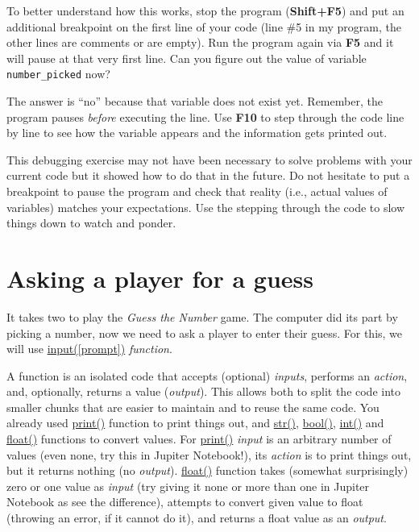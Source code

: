 \documentclass[
]{book}
\begin{document}
To better understand how this works, stop the program (\textbf{Shift+F5}) and put an additional breakpoint on the first line of your code (line \#5 in my program, the other lines are comments or are empty). Run the program again via \textbf{F5} and it will pause at that very first line. Can you figure out the value of variable \texttt{number\_picked} now?

The answer is ``no'' because that variable does not exist yet. Remember, the program pauses \emph{before} executing the line. Use \textbf{F10} to step through the code line by line to see how the variable appears and the information gets printed out.

This debugging exercise may not have been necessary to solve problems with your current code but it showed how to do that in the future. Do not hesitate to put a breakpoint to pause the program and check that reality (i.e., actual values of variables) matches your expectations. Use the stepping through the code to slow things down to watch and ponder.

\hypertarget{input-function}{%
\section{Asking a player for a guess}\label{input-function}}

It takes two to play the \emph{Guess the Number} game. The computer did its part by picking a number, now we need to ask a player to enter their guess. For this, we will use \href{https://docs.python.org/3/library/functions.html\#input}{input({[}prompt{]})} \emph{function}.

A function is an isolated code that accepts (optional) \emph{inputs}, performs an \emph{action}, and, optionally, returns a value (\emph{output}). This allows both to split the code into smaller chunks that are easier to maintain and to reuse the same code. You already used \href{https://docs.python.org/3/library/functions.html\#print}{print()} function to print things out, and \href{https://docs.python.org/3/library/functions.html\#func-str}{str()}, \href{https://docs.python.org/3/library/functions.html\#bool}{bool()}, \href{https://docs.python.org/3/library/functions.html\#int}{int()} and \href{https://docs.python.org/3/library/functions.html\#float}{float()} functions to convert values. For \href{https://docs.python.org/3/library/functions.html\#print}{print()} \emph{input} is an arbitrary number of values (even none, try this in Jupiter Notebook!), its \emph{action} is to print things out, but it returns nothing (no \emph{output}). \href{https://docs.python.org/3/library/functions.html\#float}{float()} function takes (somewhat surprisingly) zero or one value as \emph{input} (try giving it none or more than one in Jupiter Notebook as see the difference), attempts to convert given value to float (throwing an error, if it cannot do it), and returns a float value as an \emph{output}.
\end{document}
